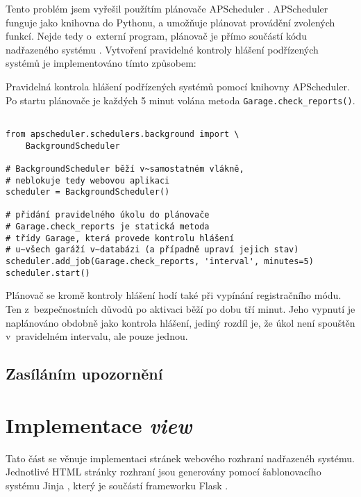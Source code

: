 Tento problém jsem vyřešil použítím plánovače APScheduler \cite{apscheduler}. APScheduler funguje jako knihovna do Pythonu, a umožňuje plánovat provádění zvolených funkcí. Nejde tedy o~externí program, plánovač je přímo součástí kódu nadřazeného systému \cite{apscheduler}. Vytvoření pravidelné kontroly hlášení podřízených systémů je implementováno tímto způsobem:

\begin{listing}[htbp]
\caption{\label{lst:scheduler_check} Pravidelná kontrola hlášení podřízených systémů pomocí knihovny APScheduler. Po startu plánovače je každých 5 minut volána metoda \texttt{Garage.check\_reports()}.}
\begin{verbatim}

from apscheduler.schedulers.background import \
    BackgroundScheduler

# BackgroundScheduler běží v~samostatném vlákně,
# neblokuje tedy webovou aplikaci
scheduler = BackgroundScheduler()

# přidání pravidelného úkolu do plánovače
# Garage.check_reports je statická metoda
# třídy Garage, která provede kontrolu hlášení
# u~všech garáží v~databázi (a případně upraví jejich stav)
scheduler.add_job(Garage.check_reports, 'interval', minutes=5)
scheduler.start()
\end{verbatim}
\end{listing}

Plánovač se kromě kontroly hlášení hodí také při vypínání registračního módu. Ten z~bezpečnostních důvodů po aktivaci běží po dobu tří minut. Jeho vypnutí je naplánováno obdobně jako kontrola hlášení, jediný rozdíl je, že úkol není spouštěn v~pravidelném intervalu, ale pouze jednou.

\subsection{Zasíláním upozornění}



\section{Implementace \textit{view}}

Tato část se věnuje implementaci stránek webového rozhraní nadřazenéh systému. Jednotlivé HTML stránky rozhraní jsou generovány pomocí šablonovacího systému Jinja \cite{jinja}, který je součástí frameworku Flask \cite{flask_templates}. 

